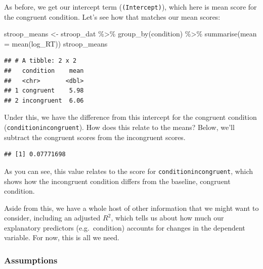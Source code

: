 \documentclass[
]{book}
\newenvironment{Shaded}{\begin{snugshade}}{\end{snugshade}}
\newcommand{\AttributeTok}[1]{\textcolor[rgb]{0.77,0.63,0.00}{#1}}
\newcommand{\DecValTok}[1]{\textcolor[rgb]{0.00,0.00,0.81}{#1}}
\newcommand{\FunctionTok}[1]{\textcolor[rgb]{0.00,0.00,0.00}{#1}}
\newcommand{\NormalTok}[1]{#1}
\newcommand{\OtherTok}[1]{\textcolor[rgb]{0.56,0.35,0.01}{#1}}
\newcommand{\SpecialCharTok}[1]{\textcolor[rgb]{0.00,0.00,0.00}{#1}}
\begin{document}
As before, we get our intercept term (\texttt{(Intercept)}), which here is mean score for the congruent condition. Let's see how that matches our mean scores:

\begin{Shaded}
\begin{Highlighting}[]
\NormalTok{stroop\_means }\OtherTok{\textless{}{-}}\NormalTok{ stroop\_dat }\SpecialCharTok{\%\textgreater{}\%} 
  \FunctionTok{group\_by}\NormalTok{(condition) }\SpecialCharTok{\%\textgreater{}\%} 
  \FunctionTok{summarise}\NormalTok{(}\AttributeTok{mean =} \FunctionTok{mean}\NormalTok{(log\_RT))}
\NormalTok{stroop\_means}
\end{Highlighting}
\end{Shaded}

\begin{verbatim}
## # A tibble: 2 x 2
##   condition    mean
##   <chr>       <dbl>
## 1 congruent    5.98
## 2 incongruent  6.06
\end{verbatim}

Under this, we have the difference from this intercept for the congruent condition (\texttt{conditionincongruent}). How does this relate to the means? Below, we'll subtract the congruent scores from the incongruent scores.

\begin{Shaded}
\end{Shaded}

\begin{verbatim}
## [1] 0.07771698
\end{verbatim}

As you can see, this value relates to the score for \texttt{conditionincongruent}, which shows how the incongruent condition differs from the baseline, congruent condition.

Aside from this, we have a whole host of other information that we might want to consider, including an adjusted \(R^2\), which tells us about how much our explanatory predictors (e.g.~condition) accounts for changes in the dependent variable. For now, this is all we need.

\hypertarget{assumptions}{%
\subsubsection{Assumptions}\label{assumptions}}
\end{document}
